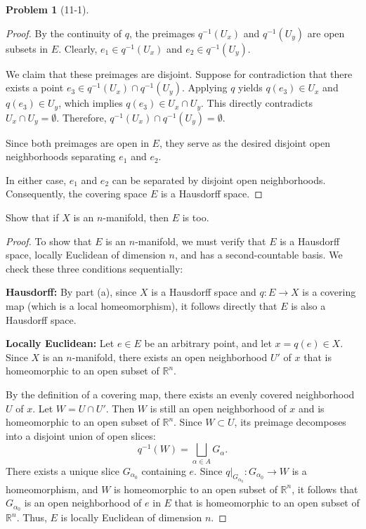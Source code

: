 \documentclass[11pt, a4paper]{article}
\theoremstyle{definition}
\newtheorem{prob}{Problem}
\newenvironment{problem}[1][]{\begin{prob}[#1]\normalfont}{\end{prob}\vspace{1.5em}}
\begin{document}
\begin{problem}[11-1]
\begin{enumerate}[(a)]
\begin{proof}
        By the continuity of $q$, the preimages $q^{-1}(U_x)$ and $q^{-1}(U_y)$ are open subsets in $E$. Clearly, $e_1 \in q^{-1}(U_x)$ and $e_2 \in q^{-1}(U_y)$.

        We claim that these preimages are disjoint. Suppose for contradiction that there exists a point $e_3 \in q^{-1}(U_x) \cap q^{-1}(U_y)$. Applying $q$ yields $q(e_3) \in U_x$ and $q(e_3) \in U_y$, which implies $q(e_3) \in U_x \cap U_y$. This directly contradicts $U_x \cap U_y = \emptyset$. Therefore, $q^{-1}(U_x) \cap q^{-1}(U_y) = \emptyset$.

        Since both preimages are open in $E$, they serve as the desired disjoint open neighborhoods separating $e_1$ and $e_2$.

        \medskip
        In either case, $e_1$ and $e_2$ can be separated by disjoint open neighborhoods. Consequently, the covering space $E$ is a Hausdorff space.
    \end{proof}

    \vspace{1em} %
    
    \item Show that if $X$ is an $n$-manifold, then $E$ is too.
    
    \begin{proof}
    To show that $E$ is an $n$-manifold, we must verify that $E$ is a Hausdorff space, locally Euclidean of dimension $n$, and has a second-countable basis. We check these three conditions sequentially:

        \item[$1^\circ$] \textbf{Hausdorff:} 
        By part (a), since $X$ is a Hausdorff space and $q: E \to X$ is a covering map (which is a local homeomorphism), it follows directly that $E$ is also a Hausdorff space.
    
        \item[$2^\circ$] \textbf{Locally Euclidean:} 
        Let $e \in E$ be an arbitrary point, and let $x = q(e) \in X$. Since $X$ is an $n$-manifold, there exists an open neighborhood $U'$ of $x$ that is homeomorphic to an open subset of $\mathbb{R}^n$. 
        
        By the definition of a covering map, there exists an evenly covered neighborhood $U$ of $x$. Let $W = U \cap U'$. Then $W$ is still an open neighborhood of $x$ and is homeomorphic to an open subset of $\mathbb{R}^n$. Since $W \subset U$, its preimage decomposes into a disjoint union of open slices:
        \[
        q^{-1}(W) = \bigsqcup_{\alpha \in A} G_\alpha.
        \]
        There exists a unique slice $G_{\alpha_0}$ containing $e$. Since $q|_{G_{\alpha_0}}: G_{\alpha_0} \to W$ is a homeomorphism, and $W$ is homeomorphic to an open subset of $\mathbb{R}^n$, it follows that $G_{\alpha_0}$ is an open neighborhood of $e$ in $E$ that is homeomorphic to an open subset of $\mathbb{R}^n$. Thus, $E$ is locally Euclidean of dimension $n$.
    

\end{proof}
\end{enumerate}
\end{problem}
\end{document}
